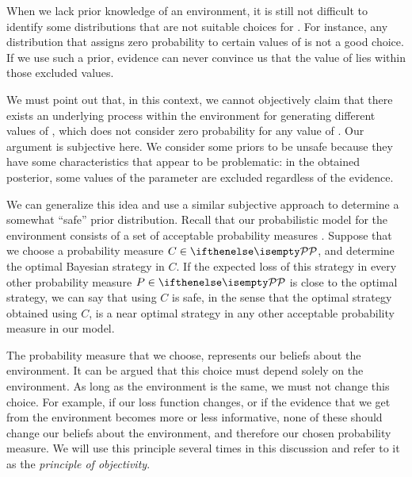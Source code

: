 When we lack prior knowledge of an environment, it is still not difficult to identify some distributions that are
not suitable choices for \prior.
For instance, any distribution that assigns zero probability to certain values of \paramValue is not a good choice.
If we use such a prior, evidence can never convince us that the value of \paramValue lies within those
excluded values.

We must point out that, in this context, we cannot objectively claim that there exists an underlying process
within the environment for generating different values of \paramValue, which does not consider zero
probability for any value of \paramValue.
Our argument is subjective here.
We consider some priors to be unsafe because they have some characteristics that appear to be problematic:
in the obtained posterior, some values of the parameter are excluded regardless of the evidence.

We can generalize this idea and use a similar subjective approach to determine a somewhat “safe”
prior distribution.
Recall that our probabilistic model for the environment consists of a set of acceptable probability measures .
Suppose that we choose a probability measure $C \in \set{P}$, and determine the optimal Bayesian strategy in $C$.
If the expected loss of this strategy in every other probability measure
$P \in \set{P}$ is close to the optimal strategy, we can say that using $C$ is safe, in the
sense that the optimal strategy obtained using $C$, is a near optimal strategy in any other acceptable probability
measure in our model.


The probability measure that we choose, represents our beliefs about the environment.
It can be argued that this choice must depend solely on the environment.
As long as the environment is the same, we must not change this choice.
For example, if our loss function changes, or if the evidence that we get from the environment becomes more or
less informative, none of these should change our beliefs about the environment, and therefore our chosen
probability measure.
We will use this principle several times in this discussion and refer to it as the \emph{principle of objectivity}.



